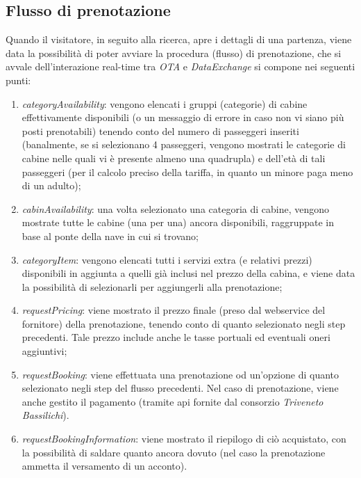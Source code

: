 \subsection{Flusso di prenotazione}
\label{section:flusso-prenotazione}
Quando il visitatore, in seguito alla ricerca, apre i dettagli di una partenza, viene data la possibilità di poter avviare la procedura (flusso) di prenotazione, che si avvale dell'interazione real-time tra \textit{OTA} e \textit{DataExchange} si compone nei seguenti punti:
\begin{enumerate}
	\item \textit{categoryAvailability}: vengono elencati i gruppi (categorie) di cabine effettivamente disponibili (o un messaggio di errore in caso non vi siano più posti prenotabili) tenendo conto del numero di passeggeri inseriti (banalmente, se si selezionano 4 passeggeri, vengono mostrati le categorie di cabine nelle quali vi è presente almeno una quadrupla) e dell'età di tali passeggeri (per il calcolo preciso della tariffa, in quanto un minore paga meno di un adulto);
	\item \textit{cabinAvailability}: una volta selezionato una categoria di cabine, vengono mostrate tutte le cabine (una per una) ancora disponibili, raggruppate in base al ponte della nave in cui si trovano;
	\item \textit{categoryItem}: vengono elencati tutti i servizi extra (e relativi prezzi) disponibili in aggiunta a quelli già inclusi nel prezzo della cabina, e viene data la possibilità di selezionarli per aggiungerli alla prenotazione;
	\item \textit{requestPricing}: viene mostrato il prezzo finale (preso dal \gls{webservice} del fornitore) della prenotazione, tenendo conto di quanto selezionato negli step precedenti. Tale prezzo include anche le tasse portuali ed eventuali oneri aggiuntivi;
	\item \textit{requestBooking}: viene effettuata una prenotazione od un'opzione di quanto selezionato negli step del flusso precedenti. Nel caso di prenotazione, viene anche gestito il pagamento (tramite \gls{api} fornite dal consorzio \textit{Triveneto Bassilichi}).
	\item \textit{requestBookingInformation}: viene mostrato il riepilogo di ciò acquistato, con la possibilità di saldare quanto ancora dovuto (nel caso la prenotazione ammetta il versamento di un acconto).
\end{enumerate}

